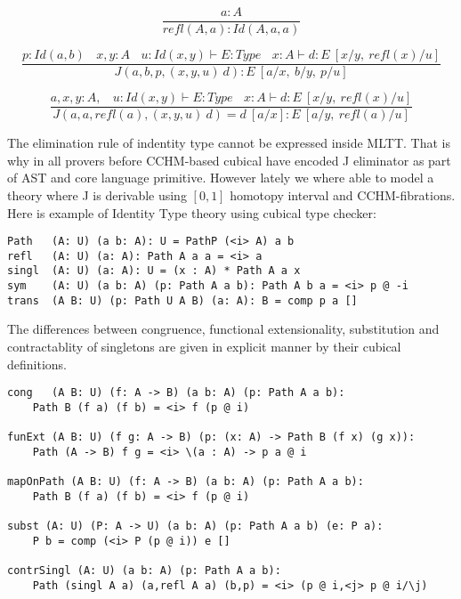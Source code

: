 \documentclass{article}
\begin{document}
\begin{equation}
\tag{$Id$-intro}
\dfrac
  {a:A}
  {refl(A,a) : Id(A,a,a) }
\end{equation}

\begin{equation}
\tag{$J$-elimination}
\dfrac
  {p:Id(a,b)\ \ \ \ x,y:A\ \ \ \ u:Id(x,y) \vdash E:Type\ \ \ \ x:A \vdash d: E\ [x/y,\ refl(x)/u]}
  {J(a,b,p,(x,y,u)\ d) : E\ [a/x,\ b/y,\ p/u]}
\end{equation}

\begin{equation}
\tag{$Id$-computation}
\dfrac
  {a,x,y:A,\ \ \ \ u:Id(x,y) \vdash E:Type\ \ \ \ x:A \vdash d:E\ [x/y,\ refl(x)/u]}
  {J(a,a,refl(a),(x,y,u)\ d) = d\ [a/x] : E\ [a/y,\ refl(a)/u]}
\end{equation}

The elimination rule of indentity type cannot be expressed inside MLTT. That is why in all provers
before CCHM-based cubical have encoded J eliminator as part of AST and core language primitive.
However lately we where able to model a theory where J is derivable using $[0,1]$
homotopy interval \cite{Mortberg17} and CCHM-fibrations. Here is example of Identity Type theory
using cubical type checker:

\begin{lstlisting}[mathescape=true]
Path   (A: U) (a b: A): U = PathP (<i> A) a b
refl   (A: U) (a: A): Path A a a = <i> a
singl  (A: U) (a: A): U = (x : A) * Path A a x
sym    (A: U) (a b: A) (p: Path A a b): Path A b a = <i> p @ -i
trans  (A B: U) (p: Path U A B) (a: A): B = comp p a []
\end{lstlisting}

\newpage
The differences between congruence, functional extensionality,
substitution and contractablity of singletons are given in explicit manner
by their cubical definitions.

\begin{lstlisting}[mathescape=true]
cong   (A B: U) (f: A -> B) (a b: A) (p: Path A a b):
    Path B (f a) (f b) = <i> f (p @ i)

funExt (A B: U) (f g: A -> B) (p: (x: A) -> Path B (f x) (g x)):
    Path (A -> B) f g = <i> \(a : A) -> p a @ i

mapOnPath (A B: U) (f: A -> B) (a b: A) (p: Path A a b):
    Path B (f a) (f b) = <i> f (p @ i)

subst (A: U) (P: A -> U) (a b: A) (p: Path A a b) (e: P a):
    P b = comp (<i> P (p @ i)) e []

contrSingl (A: U) (a b: A) (p: Path A a b):
    Path (singl A a) (a,refl A a) (b,p) = <i> (p @ i,<j> p @ i/\j)
\end{lstlisting}
\end{document}
